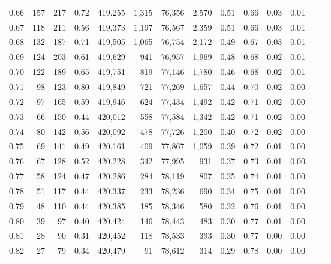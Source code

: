 \begin{tabular}{rrrrrrrrrrrrrr}
0.66 &     157 &    217 &    0.72 &  419,255 &    1,315 &  76,356 &   2,570 &  0.51 &  0.66 &  0.03 &      0.01 \\
0.67 &     118 &    211 &    0.56 &  419,373 &    1,197 &  76,567 &   2,359 &  0.51 &  0.66 &  0.03 &      0.01 \\
0.68 &     132 &    187 &    0.71 &  419,505 &    1,065 &  76,754 &   2,172 &  0.49 &  0.67 &  0.03 &      0.01 \\
0.69 &     124 &    203 &    0.61 &  419,629 &      941 &  76,957 &   1,969 &  0.48 &  0.68 &  0.02 &      0.01 \\
0.70 &     122 &    189 &    0.65 &  419,751 &      819 &  77,146 &   1,780 &  0.46 &  0.68 &  0.02 &      0.01 \\
0.71 &      98 &    123 &    0.80 &  419,849 &      721 &  77,269 &   1,657 &  0.44 &  0.70 &  0.02 &      0.00 \\
0.72 &      97 &    165 &    0.59 &  419,946 &      624 &  77,434 &   1,492 &  0.42 &  0.71 &  0.02 &      0.00 \\
0.73 &      66 &    150 &    0.44 &  420,012 &      558 &  77,584 &   1,342 &  0.42 &  0.71 &  0.02 &      0.00 \\
0.74 &      80 &    142 &    0.56 &  420,092 &      478 &  77,726 &   1,200 &  0.40 &  0.72 &  0.02 &      0.00 \\
0.75 &      69 &    141 &    0.49 &  420,161 &      409 &  77,867 &   1,059 &  0.39 &  0.72 &  0.01 &      0.00 \\
0.76 &      67 &    128 &    0.52 &  420,228 &      342 &  77,995 &     931 &  0.37 &  0.73 &  0.01 &      0.00 \\
0.77 &      58 &    124 &    0.47 &  420,286 &      284 &  78,119 &     807 &  0.35 &  0.74 &  0.01 &      0.00 \\
0.78 &      51 &    117 &    0.44 &  420,337 &      233 &  78,236 &     690 &  0.34 &  0.75 &  0.01 &      0.00 \\
0.79 &      48 &    110 &    0.44 &  420,385 &      185 &  78,346 &     580 &  0.32 &  0.76 &  0.01 &      0.00 \\
0.80 &      39 &     97 &    0.40 &  420,424 &      146 &  78,443 &     483 &  0.30 &  0.77 &  0.01 &      0.00 \\
0.81 &      28 &     90 &    0.31 &  420,452 &      118 &  78,533 &     393 &  0.30 &  0.77 &  0.00 &      0.00 \\
0.82 &      27 &     79 &    0.34 &  420,479 &       91 &  78,612 &     314 &  0.29 &  0.78 &  0.00 &      0.00 \\

\end{tabular}
